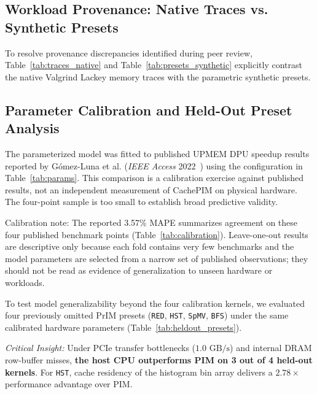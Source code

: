 \documentclass[journal,10pt,twocolumn]{IEEEtran}
\begin{document}
\subsection{Workload Provenance: Native Traces vs. Synthetic Presets}
To resolve provenance discrepancies identified during peer review, Table~\ref{tab:traces_native} and Table~\ref{tab:presets_synthetic} explicitly contrast the native Valgrind Lackey memory traces with the parametric synthetic presets.

\subsection{Parameter Calibration and Held-Out Preset Analysis}
The parameterized model was fitted to published UPMEM DPU speedup results reported by G{\'o}mez-Luna et al. (\emph{IEEE Access} 2022~\cite{GomezLuna2022}) using the configuration in Table~\ref{tab:params}. This comparison is a calibration exercise against published results, not an independent measurement of CachePIM on physical hardware. The four-point sample is too small to establish broad predictive validity.

Calibration note: The reported 3.57\% MAPE summarizes agreement on these four published benchmark points (Table~\ref{tab:calibration}). Leave-one-out results are descriptive only because each fold contains very few benchmarks and the model parameters are selected from a narrow set of published observations; they should not be read as evidence of generalization to unseen hardware or workloads.

To test model generalizability beyond the four calibration kernels, we evaluated four previously omitted PrIM presets (\texttt{RED}, \texttt{HST}, \texttt{SpMV}, \texttt{BFS}) under the same calibrated hardware parameters (Table~\ref{tab:heldout_presets}).

\textit{Critical Insight:} Under PCIe transfer bottlenecks ($1.0\text{ GB/s}$) and internal DRAM row-buffer misses, \textbf{the host CPU outperforms PIM on 3 out of 4 held-out kernels}. For \texttt{HST}, cache residency of the histogram bin array delivers a $2.78\times$ performance advantage over PIM.
\end{document}
